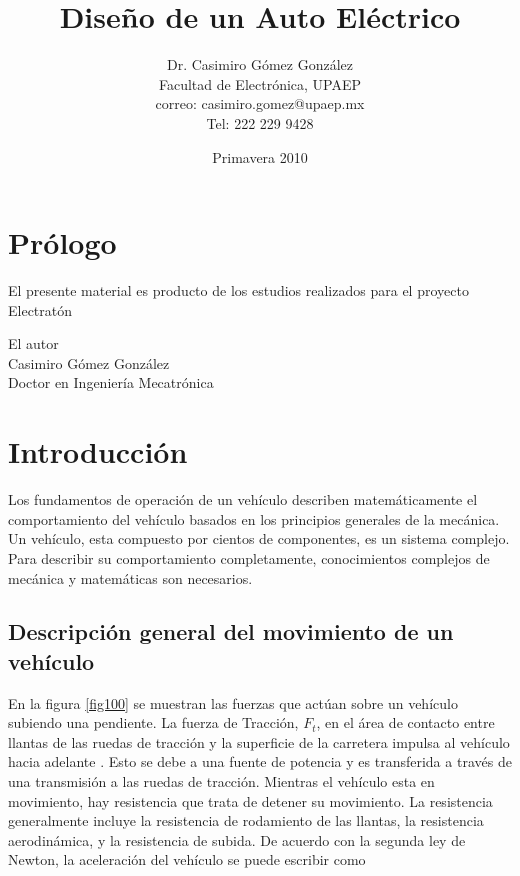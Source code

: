 \documentclass[12pt]{book}
\title{Diseño de un Auto Eléctrico}
\author{Dr. Casimiro Gómez González\\
	Facultad de Electrónica, UPAEP\\
               correo: casimiro.gomez@upaep.mx\\
               Tel: 222 229 9428}
\date{Primavera 2010}
\theoremstyle{definition}
\theoremstyle{remark}
\theoremstyle{plain}
\begin{document}
\frontmatter
\maketitle


\chapter{Prólogo}

El presente material es producto de los estudios realizados para el proyecto Electratón

\begin{flushright}

El autor\\
Casimiro Gómez González\\
Doctor en Ingeniería Mecatrónica
\end{flushright}

\tableofcontents

\mainmatter
\chapter{Introducción}

Los fundamentos de operación de un vehículo describen matemáticamente el comportamiento
del vehículo basados en los principios generales de la mecánica. Un vehículo, esta 
compuesto 
por cientos de componentes, es un sistema complejo. Para describir su comportamiento
completamente, conocimientos complejos de mecánica y matemáticas son necesarios.

\section{Descripción general del movimiento de un vehículo}

En la figura \ref{fig100} se muestran las fuerzas que actúan sobre un vehículo subiendo
 una pendiente.
La fuerza de Tracción, $F_t$, en el área de contacto entre llantas de las ruedas de 
tracción 
y la superficie de la carretera impulsa al vehículo hacia adelante
 \cite{MehrdadEhsani2005}.
Esto se debe a una fuente de potencia y es transferida a través de una transmisión a las
ruedas de tracción. Mientras el vehículo esta en movimiento, hay resistencia que trata de
detener su movimiento. La resistencia generalmente incluye la resistencia de rodamiento de 
las llantas, la resistencia aerodinámica, y la resistencia de subida. De acuerdo con la 
segunda  ley de Newton, la aceleración del vehículo se puede escribir como
\end{document}
